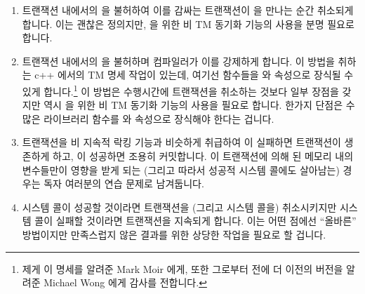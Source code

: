 \begin{enumerate}
\item	트랜잭션 내에서의  을 불허하여 이를 감싸는 트랜잭션이
	 을 만나는 순간 취소되게 합니다.
	이는 괜찮은 정의지만,  을 위한 비 TM 동기화 기능의 사용을
	분명 필요로 합니다.
\item	트랜잭션 내에서의  을 불허하며 컴파일러가 이를 강제하게
	합니다.
	이 방법을 취하는 c++ 에서의 TM 명세 작업이 있는데, 여기선 함수들을
	 와  속성으로 장식될 수
	있게 합니다.\footnote{
		제게 이 명세를 알려준 Mark Moir 에게, 또한 그로부터 전에 더
		이전의 버전을 알려준 Michael Wong 에게 감사를 전합니다.}
	이 방법은 수행시간에 트랜잭션을 취소하는 것보다 일부 장점을 갖지만 역시
	 을 위한 비 TM 동기화 기능의 사용을 필요로 합니다.
	한가지 단점은 수많은 라이브러리 함수를  와
	 속성으로 장식해야 한다는 겁니다.

\item	트랜잭션을 비 지속적 락킹 기능과 비슷하게 취급하여  이
	실패하면 트랜잭션이 생존하게 하고,  이 성공하면 조용히
	커밋합니다.
	이 트랜잭션에 의해  된 메모리 내의 변수들만이 영향을 받게
	되는 (그리고 따라서 성공적  시스템 콜에도 살아남는) 경우는
	독자 여러분의 연습 문제로 남겨둡니다.
\item	{} 시스템 콜이 성공할 것이라면 트랜잭션을 (그리고 
	시스템 콜을) 취소시키지만  시스템 콜이 실패할 것이라면
	트랜잭션을 지속되게 합니다.
	이는 어떤 점에선 ``올바른'' 방법이지만 만족스럽지 않은 결과를 위한
	상당한 작업을 필요로 할 겁니다.


\end{enumerate}
